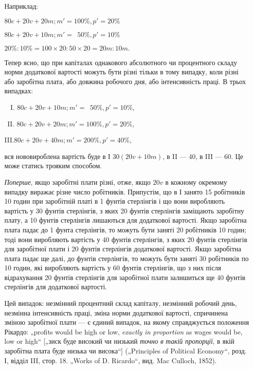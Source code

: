 
Наприклад:
\begin{center}
$80 c + 20 v + 20 m; m' = 100\%, p' = 20\%$

$80 c + 20 v + 10 m; m' = \phantom{0}50\%, p' = 10\%$

$20\%:10\% = 100×20:50×20 = 20 m:10 m.$
\end{center}

Тепер ясно, що при капіталах однакового абсолютного чи
процентного складу норми додаткової вартості можуть бути
різні тільки в тому випадку, коли різні або заробітна плата,
або довжина робочого дня, або інтенсивність праці. В трьох
випадках:
\begin{center}
$\phantom{II}$I. $80 c + 20 v + 10 m; m' = \phantom{0}50\%, p' = 10\%$,

$\phantom{I}$II. $80 c + 20 v + 20 m; m' = 100\%, p' = 20\%$,

III.$80 c + 20 v + 40 m; m' = 200\%, p' = 40\%$,
\end{center}
вся нововироблена вартість буде в І $30 (20 v + 10 m)$, в II — 40,
в III — 60. Це може статись трояким способом.

\emph{Поперше}, якщо заробітні плати різні, отже, якщо $20 v$ в кожному
окремому випадку виражає різне число робітників. Припустім,
що в І занято 15 робітників 10 годин при заробітній
платі в 1  фунтів стерлінгів і що вони виробляють вартість
у 30 фунтів стерлінгів, з яких 20 фунтів стерлінгів заміщають
заробітну плату, а 10 фунтів стерлінгів лишаються для додаткової
вартості. Якщо заробітна плата падає до 1 фунта стерлінгів,
то можуть бути заняті 20 робітників 10 годин; тоді вони
виробляють вартість у 40 фунтів стерлінгів, з яких 20 фунтів
стерлінгів для заробітної плати і 20 фунтів стерлінгів додаткової
вартості. Якщо заробітна плата падає ще далі, до  фунтів
стерлінгів, то можуть бути заняті 30 робітників по 10 годин,
які виробляють вартість у 60 фунтів стерлінгів, що з них після
відрахування 20 фунтів стерлінгів для заробітної плати залишиться
ще 40 фунтів стерлінгів для додаткової вартості.

Цей випадок: незмінний процентний склад капіталу, незмінний
робочий день, незмінна інтенсивність праці, зміна норми
додаткової вартості, спричинена зміною заробітної плати — є
єдиний випадок, на якому справджується положення Рікардо:
„profits would be high or low, \emph{exactly in proportion} as wages
would be, low or high“ [„зиск буде високий чи низький \emph{точно
в такій пропорції}, в якій заробітна плата буде низька чи висока“]
(„Principles of Political Economy“, розд. І, відділ III, стор. 18.
„Works of D. Ricardo“, вид. Mac Culloch, 1852).

